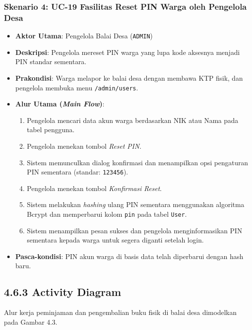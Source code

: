 \documentclass[
  indonesian,
  12pt,
]{report}
\providecommand{\tightlist}{%
  \setlength{\itemsep}{0pt}\setlength{\parskip}{0pt}}
\begin{document}
\subsubsection{Skenario 4: UC-19 Fasilitas Reset PIN Warga oleh
Pengelola
Desa}\label{skenario-4-uc-19-fasilitas-reset-pin-warga-oleh-pengelola-desa}

\begin{itemize}
\tightlist
\item
  \textbf{Aktor Utama}: Pengelola Balai Desa (\texttt{ADMIN})
\item
  \textbf{Deskripsi}: Pengelola mereset PIN warga yang lupa kode
  aksesnya menjadi PIN standar sementara.
\item
  \textbf{Prakondisi}: Warga melapor ke balai desa dengan membawa KTP
  fisik, dan pengelola membuka menu \texttt{/admin/users}.
\item
  \textbf{Alur Utama (\emph{Main Flow})}:

  \begin{enumerate}
  \def\labelenumi{\arabic{enumi}.}
  \tightlist
  \item
    Pengelola mencari data akun warga berdasarkan NIK atau Nama pada
    tabel pengguna.
  \item
    Pengelola menekan tombol \emph{Reset PIN}.
  \item
    Sistem memunculkan dialog konfirmasi dan menampilkan opsi pengaturan
    PIN sementara (standar: \texttt{123456}).
  \item
    Pengelola menekan tombol \emph{Konfirmasi Reset}.
  \item
    Sistem melakukan \emph{hashing} ulang PIN sementara menggunakan
    algoritma Bcrypt dan memperbarui kolom \texttt{pin} pada tabel
    \texttt{User}.
  \item
    Sistem menampilkan pesan sukses dan pengelola menginformasikan PIN
    sementara kepada warga untuk segera diganti setelah login.
  \end{enumerate}
\item
  \textbf{Pasca-kondisi}: PIN akun warga di basis data telah diperbarui
  dengan hash baru.
\end{itemize}

\subsection{4.6.3 Activity Diagram}\label{activity-diagram}

Alur kerja peminjaman dan pengembalian buku fisik di balai desa
dimodelkan pada Gambar 4.3.
\end{document}
